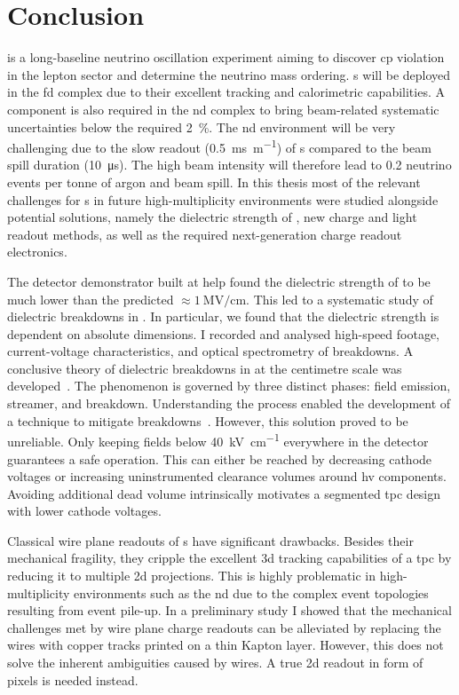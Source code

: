 \chapter{Conclusion}
\label{chap:conclusion}

\dune{} is a long-baseline neutrino oscillation experiment aiming to discover \gls{cp} violation in the lepton sector and determine the neutrino mass ordering.
\lartpc{}s will be deployed in the \gls{fd} complex due to their excellent tracking and calorimetric capabilities.
A \lartpc{} component is also required in the \gls{nd} complex to bring beam-related systematic uncertainties below the required \SI{2}{\percent}.
The \gls{nd} environment will be very challenging due to the slow readout (\SI{0.5}{\milli\second\per\metre}) of \lartpc{}s compared to the beam spill duration (\SI{10}{\micro\second}).
The high beam intensity will therefore lead to \num{0.2} neutrino events per tonne of argon and beam spill.
In this thesis most of the relevant challenges for \lartpc{}s in future high-multiplicity environments were studied alongside potential solutions, namely the dielectric strength of \lar{}, new charge and light readout methods, as well as the required next-generation charge readout electronics.

The \AT{} detector demonstrator built at \gls{help} found the dielectric strength of \lar{} to be much lower than the predicted $\approx \SI{1}{\mega\volt\per\centi\metre}$.
This led to a systematic study of dielectric breakdowns in \lar{}.
In particular, we found that the dielectric strength is dependent on absolute dimensions.
I recorded and analysed high-speed footage, current-voltage characteristics, and optical spectrometry of breakdowns.
A conclusive theory of dielectric breakdowns in \lar{} at the centimetre scale was developed~\cite{breakdown_16}.
The phenomenon is governed by three distinct phases: field emission, streamer, and breakdown.
Understanding the process enabled the development of a technique to mitigate breakdowns~\cite{latex}.
However, this solution proved to be unreliable.
Only keeping fields below \SI{40}{\kilo\volt\per\centi\metre} everywhere in the detector guarantees a safe operation.
This can either be reached by decreasing cathode voltages or increasing uninstrumented clearance volumes around \gls{hv} components.
Avoiding additional dead \lar{} volume intrinsically motivates a segmented \gls{tpc} design with lower cathode voltages.

Classical wire plane readouts of \lartpc{}s have significant drawbacks.
Besides their mechanical fragility, they cripple the excellent \gls{3d} tracking capabilities of a \gls{tpc} by reducing it to multiple \gls{2d} projections.
This is highly problematic in high-multiplicity environments such as the \dune{} \gls{nd} due to the complex event topologies resulting from event pile-up.
In a preliminary study I showed that the mechanical challenges met by wire plane charge readouts can be alleviated by replacing the wires with copper tracks printed on a thin Kapton layer.
However, this does not solve the inherent ambiguities caused by wires.
A true \gls{2d} readout in form of pixels is needed instead.

